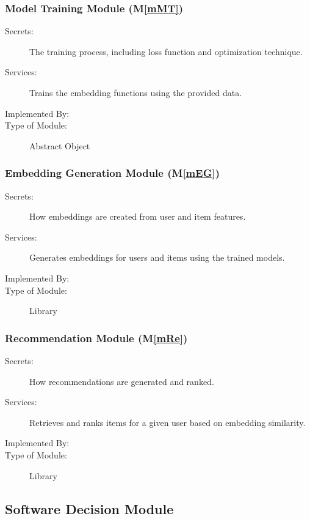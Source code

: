 \documentclass[12pt, titlepage]{article}
\newcommand{\mref}[1]{M\ref{#1}}
\begin{document}
\subsubsection{Model Training Module (\mref{mMT})}

\begin{description}
\item[Secrets:]The training process, including loss function and optimization technique.
\item[Services:]Trains the embedding functions using the provided data.
\item[Implemented By:] \progname
\item[Type of Module:] Abstract Object
\end{description}

\subsubsection{Embedding Generation Module (\mref{mEG})}

\begin{description}
\item[Secrets:]How embeddings are created from user and item features.
\item[Services:]Generates embeddings for users and items using the trained models.
\item[Implemented By:] \progname
\item[Type of Module:] Library
\end{description}

\subsubsection{Recommendation Module (\mref{mRe})}

\begin{description}
\item[Secrets:]How recommendations are generated and ranked.
\item[Services:]Retrieves and ranks items for a given user based on embedding similarity.
\item[Implemented By:] \progname
\item[Type of Module:] Library
\end{description}


\subsection{Software Decision Module}
\end{document}
